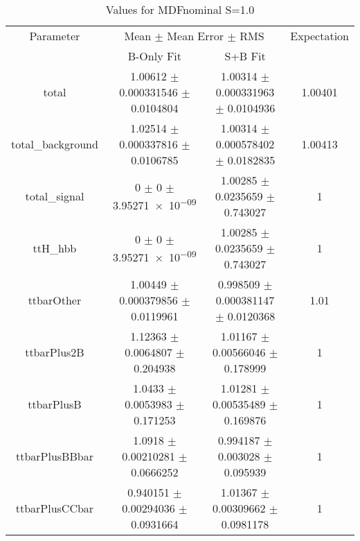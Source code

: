 \begin{table}
\centering
\caption{Values for MDFnominal S=1.0}
\begin{tabular}{cccc}
\toprule
Parameter & \multicolumn{2}{c}{Mean $\pm$ Mean Error $\pm$ RMS} & Expectation\\
 & B-Only Fit & S+B Fit & \\
\midrule
total & \num{1.00612} $\pm$ \num{0.000331546} $\pm$ \num{0.0104804} & \num{1.00314} $\pm$ \num{0.000331963} $\pm$ \num{0.0104936} & \num{1.00401}\\
total\_background & \num{1.02514} $\pm$ \num{0.000337816} $\pm$ \num{0.0106785} & \num{1.00314} $\pm$ \num{0.000578402} $\pm$ \num{0.0182835} & \num{1.00413}\\
total\_signal & \num{0} $\pm$ \num{0} $\pm$ \num{3.95271e-09} & \num{1.00285} $\pm$ \num{0.0235659} $\pm$ \num{0.743027} & \num{1}\\
ttH\_hbb & \num{0} $\pm$ \num{0} $\pm$ \num{3.95271e-09} & \num{1.00285} $\pm$ \num{0.0235659} $\pm$ \num{0.743027} & \num{1}\\
ttbarOther & \num{1.00449} $\pm$ \num{0.000379856} $\pm$ \num{0.0119961} & \num{0.998509} $\pm$ \num{0.000381147} $\pm$ \num{0.0120368} & \num{1.01}\\
ttbarPlus2B & \num{1.12363} $\pm$ \num{0.0064807} $\pm$ \num{0.204938} & \num{1.01167} $\pm$ \num{0.00566046} $\pm$ \num{0.178999} & \num{1}\\
ttbarPlusB & \num{1.0433} $\pm$ \num{0.0053983} $\pm$ \num{0.171253} & \num{1.01281} $\pm$ \num{0.00535489} $\pm$ \num{0.169876} & \num{1}\\
ttbarPlusBBbar & \num{1.0918} $\pm$ \num{0.00210281} $\pm$ \num{0.0666252} & \num{0.994187} $\pm$ \num{0.003028} $\pm$ \num{0.095939} & \num{1}\\
ttbarPlusCCbar & \num{0.940151} $\pm$ \num{0.00294036} $\pm$ \num{0.0931664} & \num{1.01367} $\pm$ \num{0.00309662} $\pm$ \num{0.0981178} & \num{1}\\
\bottomrule
\end{tabular}
\end{table}